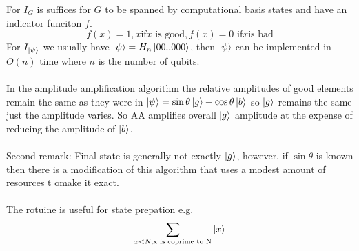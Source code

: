 \documentclass{article}
\begin{document}
For $I_G$ is suffices for $G$ to be spanned by computational basis states and have an indicator funciton $f$.
$$
f(x) = 1, x \text{if} x\text{ is good}, f(x) = 0 \text{ if} x \text{is bad}
$$
For $I_{\ket{\psi}}$ we usually have $\ket{\psi} = H_n \ket{00..000}$, then $\ket{\psi}$ can be implemented in $O(n)$ time where $n$ is the number of qubits.\\\\
In the amplitude amplification algorithm the relative amplitudes of good elements remain the same as they were in $\ket{\psi} = \sin \theta \ket{g} + \cos \theta \ket{b}$ so $\ket{g}$ remains the same just the amplitude varies. So AA amplifies overall $\ket{g}$ amplitude at the expense of reducing the amplitude of $\ket{b}$.\\\\
Second remark: Final state is generally not exactly $\ket{g}$, however, if $\sin \theta$ is known then there is a modification of this algorithm that uses a modest amount of resources t omake it exact.\\\\
The rotuine is useful for state prepation e.g.
$$
\sum_{x < N, \text{x is coprime to N}} \ket{x}
$$
\end{document}
